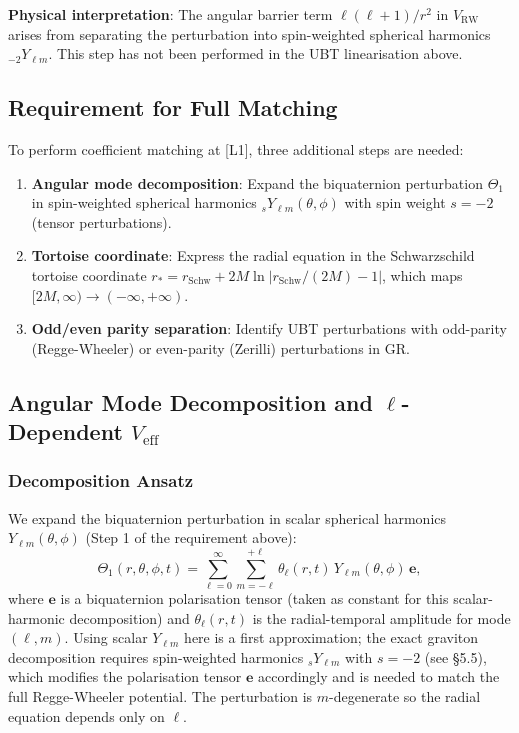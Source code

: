 \documentclass[12pt]{article}
\theoremstyle{definition}
\theoremstyle{remark}
\begin{document}
\textbf{Physical interpretation}: The angular barrier term
$\ell(\ell+1)/r^2$ in $V_{\text{RW}}$ arises from separating
the perturbation into spin-weighted spherical harmonics ${}_{-2}Y_{\ell m}$.
This step has not been performed in the UBT linearisation above.

\subsection{Requirement for Full Matching}

To perform coefficient matching at [L1], three additional steps are needed:

\begin{enumerate}
  \item \textbf{Angular mode decomposition}: Expand the biquaternion
        perturbation $\Theta_1$ in spin-weighted spherical harmonics
        ${}_{s}Y_{\ell m}(\theta,\phi)$ with spin weight $s = -2$
        (tensor perturbations).

  \item \textbf{Tortoise coordinate}: Express the radial equation in the
        Schwarzschild tortoise coordinate
        $r_* = r_{\text{Schw}} + 2M\ln\bigl|r_{\text{Schw}}/(2M)-1\bigr|$,
        which maps $[2M, \infty) \to (-\infty, +\infty)$.

  \item \textbf{Odd/even parity separation}: Identify UBT perturbations
        with odd-parity (Regge-Wheeler) or even-parity (Zerilli)
        perturbations in GR.
\end{enumerate}

\subsection{Angular Mode Decomposition and $\ell$-Dependent $V_{\text{eff}}$}

\subsubsection{Decomposition Ansatz}

We expand the biquaternion perturbation in scalar spherical harmonics
$Y_{\ell m}(\theta, \phi)$ (Step 1 of the requirement above):
\begin{equation}
  \label{eq:angular_decomp}
  \Theta_1(r, \theta, \phi, t) = \sum_{\ell=0}^{\infty}\sum_{m=-\ell}^{+\ell}
  \theta_\ell(r, t)\,Y_{\ell m}(\theta, \phi)\,\mathbf{e},
\end{equation}
where $\mathbf{e}$ is a biquaternion polarisation tensor (taken as constant
for this scalar-harmonic decomposition) and
$\theta_\ell(r,t)$ is the radial-temporal amplitude for mode $(\ell, m)$.
Using scalar $Y_{\ell m}$ here is a first approximation; the exact graviton
decomposition requires spin-weighted harmonics ${}_{s}Y_{\ell m}$ with $s=-2$
(see \S5.5), which modifies the polarisation tensor $\mathbf{e}$ accordingly
and is needed to match the full Regge-Wheeler potential.
The perturbation is $m$-degenerate so the radial equation depends only on $\ell$.
\end{document}
